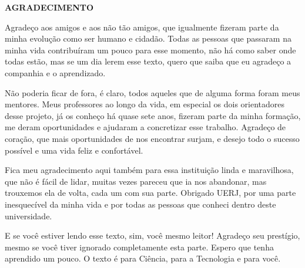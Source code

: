 \begin{center}
\textbf{AGRADECIMENTO}
\end{center}

$\!$\\

Agradeço aos amigos e aos não tão amigos, que igualmente fizeram parte da minha evolução como ser humano e cidadão. Todas as pessoas que passaram na minha vida contribuíram um pouco para esse momento, não há como saber onde todas estão, mas se um dia lerem esse texto, quero que saiba que eu agradeço a companhia e o aprendizado.

Não poderia ficar de fora, é claro, todos aqueles que de alguma forma foram meus mentores. Meus professores ao longo da vida, em especial os dois orientadores desse projeto, já os conheço há quase sete anos, fizeram parte da minha formação, me deram oportunidades e ajudaram a concretizar esse trabalho. Agradeço de coração, que mais oportunidades de nos encontrar surjam, e desejo todo o sucesso possível e uma vida feliz e confortável.

Fica meu agradecimento aqui também para essa instituição linda e maravilhosa, que não é fácil de lidar, muitas vezes pareceu que ia nos abandonar, mas trouxemos ela de volta, cada um com sua parte. Obrigado UERJ, por uma parte inesquecível da minha vida e por todas as pessoas que conheci dentro deste universidade.

E se você estiver lendo esse texto, sim, você mesmo leitor! Agradeço seu prestígio, mesmo se você tiver ignorado completamente esta parte. Espero que tenha aprendido um pouco. O texto é para Ciência, para a Tecnologia e para você.

 